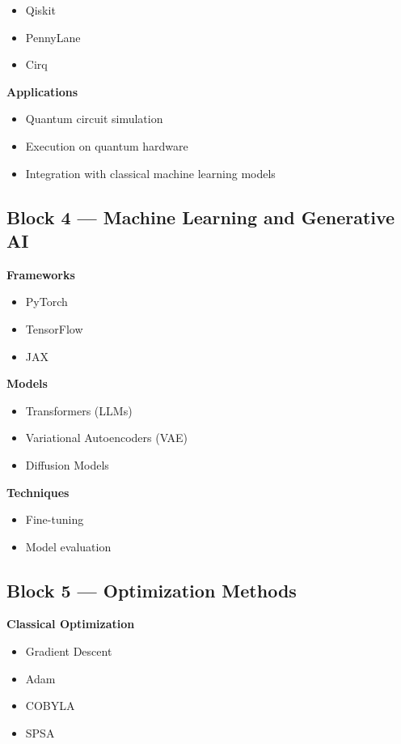 \documentclass[a4paper,12pt]{book}
\begin{document}
\begin{itemize}
    \item Qiskit
    \item PennyLane
    \item Cirq
\end{itemize}

\textbf{Applications}
\begin{itemize}
    \item Quantum circuit simulation
    \item Execution on quantum hardware
    \item Integration with classical machine learning models
\end{itemize}

\subsection*{Block 4 — Machine Learning and Generative AI}

\textbf{Frameworks}
\begin{itemize}
    \item PyTorch
    \item TensorFlow
    \item JAX
\end{itemize}

\textbf{Models}
\begin{itemize}
    \item Transformers (LLMs)
    \item Variational Autoencoders (VAE)
    \item Diffusion Models
\end{itemize}

\textbf{Techniques}
\begin{itemize}
    \item Fine-tuning
    \item Model evaluation
\end{itemize}

\subsection*{Block 5 — Optimization Methods}

\textbf{Classical Optimization}
\begin{itemize}
    \item Gradient Descent
    \item Adam
    \item COBYLA
    \item SPSA
\end{itemize}
\end{document}
